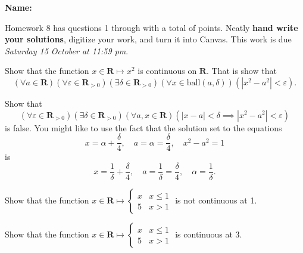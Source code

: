 \documentclass[12pt,fleqn]{exam}
\newcommand{\reals}{\mathbf{R}}
\newcommand{\ball}{\mathrm{ball}}
\newcommand\PM{{\sc pm}}
\newcommand{\quiz}{8}
\newcommand{\term}{Fall}
\newcommand{\due}{Saturday 15 October  at 11:59 \PM}
\begin{document}
\large
\vspace{0.1in}
\noindent{}
{\bf Name:}  \\
\noindent \makebox[3.0truein][l]{\bf Homework   \quiz, \term \/ \the\year}
\vspace{0.1in}

\begin{quote}
    \end{quote}
\noindent  Homework    \quiz\/  has questions 1 through  \numquestions \/ with a total of  \numpoints\/  points.   
Neatly \textbf{hand write your solutions}, digitize your work, and turn it into Canvas. This work is due \emph{\due}.

\vspace{0.1in}


\begin{questions} 

\question Show that the function $x \in \reals \mapsto x^2$ is continuous on $\reals$. 
That is show that
\begin{equation*}
    \left(\forall a \in \reals \right) 
    \left(\forall \varepsilon \in \reals_{>0} \right)
    \left(\exists \delta \in \reals_{>0} \right)
    \left(\forall x \in \ball(a,\delta) \right)
    \left(|x^2 - a^2| < \varepsilon \right).
\end{equation*}


\question Show that
\begin{equation*}
     \left(\forall \varepsilon \in \reals_{>0} \right)
    \left(\exists \delta \in \reals_{>0} \right)
    \left(\forall a, x \in \reals \right)
    \left(|x - a| < \delta \implies |x^2 - a^2| < \varepsilon \right)
\end{equation*}
is false.  You might like to use the fact that the solution set to the equations
\begin{equation*}
     x = \alpha + \frac{\delta}{4}, \quad a = \alpha = \frac{\delta}{4},
     \quad x^2 - a^2 = 1
\end{equation*}
is 
\begin{equation*}
    x = \frac{1}{\delta} + \frac{\delta}{4}, \quad 
    a =  \frac{1}{\delta} = \frac{\delta}{4}, \quad
    \alpha =  \frac{1}{\delta}.
\end{equation*}

\question Show that the function $x \in \reals \mapsto 
\begin{cases} x & x \leq 1 \\ 5 & x > 1 \end{cases}$ is not continuous at 1.

\question Show that the function $x \in \reals \mapsto 
\begin{cases} x & x \leq 1 \\ 5 & x > 1 \end{cases}$ is continuous at 3.
\end{questions}
\end{document}
